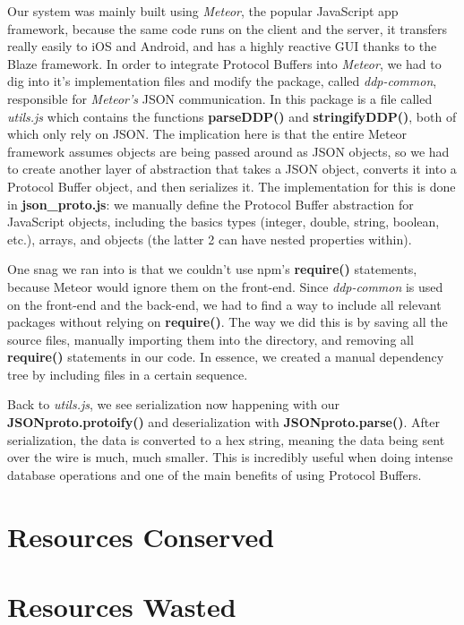 \documentclass[a4paper, 11pt]{article} %
\begin{document}
Our system was mainly built using \textit{Meteor}, the popular JavaScript app framework, because the same code runs on the client and the server, it transfers really easily to iOS and Android, and has a highly reactive GUI thanks to the Blaze framework. In order to integrate Protocol Buffers into \textit{Meteor}, we had to dig into it's implementation files and modify the package, called \textit{ddp-common}, responsible for \textit{Meteor's} JSON communication. In this package is a file called \textit{utils.js} which contains the functions \textbf{parseDDP()} and \textbf{stringifyDDP()}, both of which only rely on JSON. The implication here is that the entire Meteor framework assumes objects are being passed around as JSON objects, so we had to create another layer of abstraction that takes a JSON object, converts it into a Protocol Buffer object, and then serializes it. The implementation for this is done in \textbf{json\_proto.js}: we manually define the Protocol Buffer abstraction for JavaScript objects, including the basics types (integer, double, string, boolean, etc.), arrays, and objects (the latter 2 can have nested properties within). 

One snag we ran into is that we couldn't use npm's \textbf{require()} statements, because Meteor would ignore them on the front-end. Since \textit{ddp-common} is used on the front-end and the back-end, we had to find a way to include all relevant packages without relying on \textbf{require()}. The way we did this is by saving all the source files, manually importing them into the directory, and removing all \textbf{require()} statements in our code. In essence, we created a manual dependency tree by including files in a certain sequence. 

Back to \textit{utils.js}, we see serialization now happening with our \textbf{JSONproto.protoify()} and deserialization with \textbf{JSONproto.parse()}. After serialization, the data is converted to a hex string, meaning the data being sent over the wire is much, much smaller. This is incredibly useful when doing intense database operations and one of the main benefits of using Protocol Buffers.

\section*{Resources Conserved}

\section*{Resources Wasted}
\end{document}
